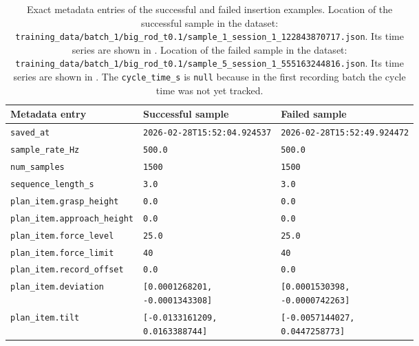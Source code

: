 \begin{table}[htbp]
    \centering
    \caption{Exact metadata entries of the successful and failed insertion examples. Location of the successful sample in the dataset: \texttt{training\_data/batch\_1/big\_rod\_t0.1/sample\_1\_session\_1\_122843870717.json}. Its time series are shown in . Location of the failed sample in the dataset: \texttt{training\_data/batch\_1/big\_rod\_t0.1/sample\_5\_session\_1\_555163244816.json}. Its time series are shown in . The \texttt{cycle\_time\_s} is \texttt{null} because in the first recording batch the cycle time was not yet tracked.}
    \label{tab:example_sample_metadata}
    \small
    \renewcommand{\arraystretch}{1.15}
    \begin{tabular}{lll}
        \hline
        Metadata entry & Successful sample & Failed sample \\
        \hline
        \texttt{saved\_at} & \texttt{2026-02-28T15:52:04.924537} & \texttt{2026-02-28T15:52:49.924472} \\
        \texttt{sample\_rate\_Hz} & \texttt{500.0} & \texttt{500.0} \\
        \texttt{num\_samples} & \texttt{1500} & \texttt{1500} \\
        \texttt{sequence\_length\_s} & \texttt{3.0} & \texttt{3.0} \\
        \hline
        \texttt{plan\_item.grasp\_height} & \texttt{0.0} & \texttt{0.0} \\
        \texttt{plan\_item.approach\_height} & \texttt{0.0} & \texttt{0.0} \\
        \texttt{plan\_item.force\_level} & \texttt{25.0} & \texttt{25.0} \\
        \texttt{plan\_item.force\_limit} & \texttt{40} & \texttt{40} \\
        \texttt{plan\_item.record\_offset} & \texttt{0.0} & \texttt{0.0} \\
        \texttt{plan\_item.deviation} &
        \makecell[l]{\texttt{[0.0001268201,}\\\texttt{-0.0001343308]}} &
        \makecell[l]{\texttt{[0.0001530398,}\\\texttt{-0.0000742263]}} \\
        \texttt{plan\_item.tilt} &
        \makecell[l]{\texttt{[-0.0133161209,}\\\texttt{0.0163388744]}} &
        \makecell[l]{\texttt{[-0.0057144027,}\\\texttt{0.0447258773]}} \\

\end{tabular}
\end{table}
